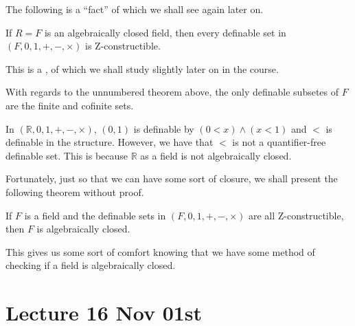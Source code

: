 \documentclass[notoc,notitlepage]{tufte-book}
\begin{document}
The following is a ``fact'' of which we shall see again later on.

\begin{thmnonum}
  If $R = F$ is an algebraically closed field, then every definable set in $(F, 0, 1, +, -, \times)$ is Z-constructible.
\end{thmnonum}

This is a , of which we shall study slightly later on in the course.

\begin{remark}
  With regards to the unnumbered theorem above, the only definable subsetes of $F$ are the finite and cofinite sets.
\end{remark}

\begin{eg}
  In $(\mathbb{R}, 0, 1, +, -, \times)$, $(0, 1)$ is definable by $(0 < x) \land (x < 1)$ and $<$ is definable in the structure. However, we have that $<$ is not a quantifier-free definable set. This is because $\mathbb{R}$ as a field is not algebraically closed.
\end{eg}

Fortunately, just so that we can have some sort of closure, we shall present the following theorem without proof.

\begin{thmnonum}[Macintyre]\label{thmnonum:macintyre}
  If $F$ is a field and the definable sets in $(F, 0, 1, +, -, \times)$ are all Z-constructible, then $F$ is algebraically closed.
\end{thmnonum}

This gives us some sort of comfort knowing that we have some method of checking if a field is algebraically closed.




\chapter{Lecture 16 Nov 01st}%
\label{chp:lecture_16_nov_01st}
\end{document}
